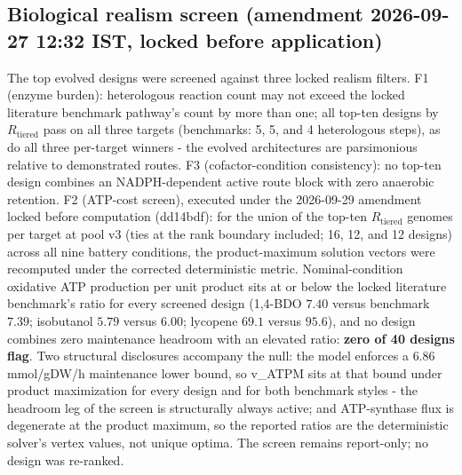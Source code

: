 \documentclass[12pt,a4paper]{article}
\begin{document}
\subsection{Biological realism screen (amendment 2026-09-27 12:32 IST, locked before application)}
The top evolved designs were screened against three locked realism filters. F1 (enzyme burden): heterologous reaction count may not exceed the locked literature benchmark pathway's count by more than one; all top-ten designs by $R_{\mathrm{tiered}}$ pass on all three targets (benchmarks: 5, 5, and 4 heterologous steps), as do all three per-target winners - the evolved architectures are parsimonious relative to demonstrated routes. F3 (cofactor-condition consistency): no top-ten design combines an NADPH-dependent active route block with zero anaerobic retention. F2 (ATP-cost screen), executed under the 2026-09-29 amendment locked before computation (dd14bdf): for the union of the top-ten $R_{\mathrm{tiered}}$ genomes per target at pool v3 (ties at the rank boundary included; 16, 12, and 12 designs) across all nine battery conditions, the product-maximum solution vectors were recomputed under the corrected deterministic metric. Nominal-condition oxidative ATP production per unit product sits at or below the locked literature benchmark's ratio for every screened design (1,4-BDO $7.40$ versus benchmark $7.39$; isobutanol $5.79$ versus $6.00$; lycopene $69.1$ versus $95.6$), and no design combines zero maintenance headroom with an elevated ratio: \textbf{zero of 40 designs flag}. Two structural disclosures accompany the null: the model enforces a $6.86$ mmol/gDW/h maintenance lower bound, so v\_ATPM sits at that bound under product maximization for every design and for both benchmark styles - the headroom leg of the screen is structurally always active; and ATP-synthase flux is degenerate at the product maximum, so the reported ratios are the deterministic solver's vertex values, not unique optima. The screen remains report-only; no design was re-ranked.
\end{document}
